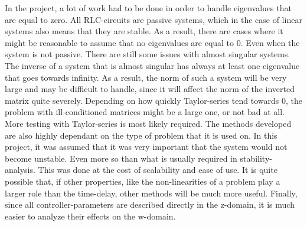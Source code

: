 In the project, a lot of work had to be done in order to handle eigenvalues that are equal to zero. All RLC-circuits are passive systems, which in the case of linear systems also means that they are stable. As a result, there are cases where it might be reasonable to assume that no eigenvalues are equal to 0. Even when the system is not passive. There are still some issues with almost singular systems. The inverse of a system that is almost singular has always at least one eigenvalue that goes towards infinity. As a result, the norm of such a system will be very large and may be difficult to handle, since it will affect the norm of the inverted matrix quite severely. Depending on how quickly Taylor-series tend towards 0, the problem with ill-conditioned matrices might be a large one, or not bad at all. More testing with Taylor-series is most likely required. 
\noindent
The methods developed are also highly dependant on the type of problem that it is used on. In this project, it was assumed that it was very important that the system would not become unstable. Even more so than what is usually required in stability-analysis. This was done at the cost of scalability and ease of use. It is quite possible that, if other properties, like the non-linearities of a problem play a larger role than the time-delay, other methods will be much more useful. Finally, since all controller-parameters are described directly in the z-domain, it is much easier to analyze their effects on the w-domain. 


